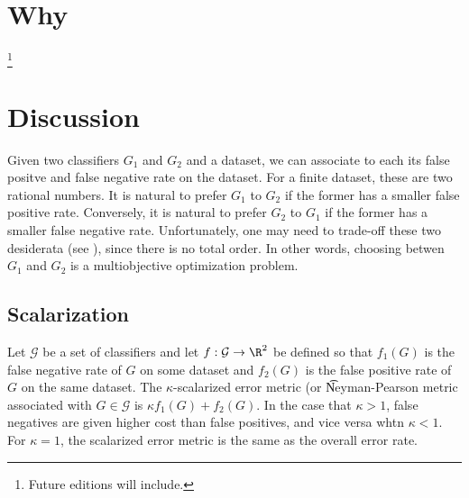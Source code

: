

\section*{Why}
\footnote{Future editions will include.}
\section*{Discussion}

Given two classifiers $G_1$ and $G_2$ and a dataset, we can associate to each its false positve and false negative rate on the dataset.
For a finite dataset, these are two rational numbers.
It is natural to prefer $G_1$ to $G_2$ if the former has a smaller false positive rate.
Conversely, it is natural to prefer $G_2$ to $G_1$ if the former has a smaller false negative rate.
Unfortunately, one may need to trade-off these two desiderata (see ), since there is no total order.
In other words, choosing betwen $G_1$ and $G_2$ is a multiobjective optimization problem.

\subsection*{Scalarization}

Let $\mathcal{G} $ be a set of classifiers and let $f: \mathcal{G}  \to \R ^2$ be defined so that $f_1(G)$ is the false negative rate of $G$ on some dataset and $f_2(G)$ is the false positive rate of $G$ on the same dataset.
The \t{$\kappa $-scalarized error metric} (or \t{Neyman-Pearson metric} associated with $G \in \mathcal{G} $ is $\kappa  f_1(G) + f_2(G)$.
In the case that $\kappa  > 1$, false negatives are given higher cost than false positives, and vice versa whtn $\kappa  < 1$.
For $\kappa  = 1$, the scalarized error metric is the same as the overall error rate.

\blankpage